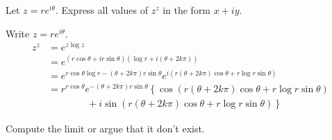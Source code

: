\documentclass[12pt]{exam}
\begin{document}
\begin{questions}
    \question Let $z=re^{i\theta}$. Express all values of $z^z$ in the form $x+iy$.

    \begin{solution}
        Write $z=re^{i\theta}$.
        \begin{align*}
            z^z &= e^{z\log z}\\
            &= e^{(r\cos\theta+ir\sin\theta)(\log r + i(\theta+2k\pi))}\\
            &= e^{r\cos\theta\log r - (\theta + 2k\pi) r\sin\theta}e^{i(r(\theta+2k\pi)\cos\theta + r\log r\sin\theta)}\\
            &= r^{r\cos\theta}e^{- (\theta+2k\pi) r\sin\theta}\left\{\cos(r(\theta+2k\pi)\cos\theta + r\log r\sin\theta)\right.\\
            &\qquad\qquad+ \left.i\sin(r(\theta+2k\pi)\cos\theta + r\log r\sin\theta)\right\}
        \end{align*}
    \end{solution}

    \question
    Compute the limit or argue that it don't exist.
\end{questions}
\end{document}
